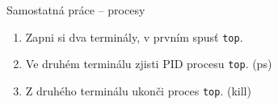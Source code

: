\documentclass{beamer}
\begin{document}
\begin{frame}{Samostatná práce – procesy}
	\small
	\begin{enumerate}
		\item Zapni si dva terminály, v prvním spusť \texttt{top}.
		\item Ve druhém terminálu zjisti PID procesu \texttt{top}. (ps)
		\item Z druhého terminálu ukonči proces \texttt{top}. (kill)
	\end{enumerate}
\end{frame}
	
\end{document}
